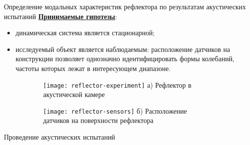 \begin{frame}{Определение модальных характеристик рефлектора по результатам акустических испытаний}
	\textbf{\underline{Принимаемые гипотезы}}:
	\begin{itemize}
		\item динамическая система является стационарной;
		\item исследуемый объект является наблюдаемым: расположение датчиков на конструкции позволяет однозначно идентифицировать формы колебаний, частоты которых лежат в интересующем диапазоне.
	\end{itemize}
	\begin{center}
		\begin{figure}
			\centering
			\small
			\begin{subfigure}[t]{0.49\textwidth}
				\texttt{[image: reflector-experiment]}
				а) Рефлектор в акустической камере
			\end{subfigure}
			\hfill
			\begin{subfigure}[t]{0.49\textwidth}
				\texttt{[image: reflector-sensors]} 
				б) Расположение датчиков на поверхности рефлектора
			\end{subfigure}
		\end{figure}
		\vspace{0.5em}
		Проведение акустических испытаний
	\end{center}
\end{frame}

